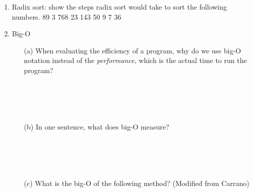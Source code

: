 \documentclass[letter]{article}
\begin{document}
\begin{enumerate} [1.]
\begin{itemize}
        \item [(b)] If I expect to be inserting a lot of elements at the beginning of a list, should I use a dynamic array (like arrayList) or a Linked List? Why? (Question from Ellie Mamantov)

        \item [(c)] Write a method for a singly linkedlist class \textbf{public SimpleLinkedList<E> reverse()} that returns a new linked list but with items in the reversed order.\\

        For example, if lst is a linked list with items {1,2,3} then lst.reversed() should return a new linked list with items {3,2,1}

        \newpage

\begin{verbatim}

public SimpleLinkedList<E> reverse() {
    SimpleLinkedList<E> reversed = new SimpleLinkedList<E>();
        
    if (numItems > 0) {
        Node<E> temp = head; 
        //Your code here


        
            
        while(..................) {
        //Your code here



            
        }       
    }
    return .........;
}

\end{verbatim}
    \end{itemize}

    \item Radix sort: show the steps radix sort would take to sort the following numbers. 89 3 768 23 143 50 9 7 36

    \item Big-O
    \begin{itemize}
        \item [(a)] When evaluating the efficiency of a program, why do we use big-O notation instead of the \textit{performance}, which is the actual time to run the program?\\\\\\\\\\
        \item [(b)] In one sentence, what does big-O measure?\\\\\\\\\\
        \item [(c)] What is the big-O of the following method? (Modified from Carrano)


\end{itemize}
\end{enumerate}
\end{document}
